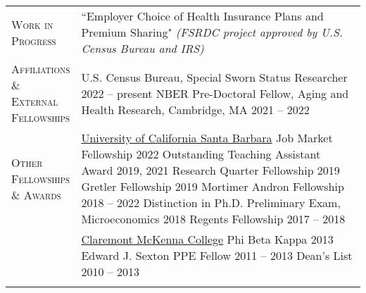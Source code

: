 \documentclass[11pt]{article}
\begin{document}
\begin{tabularx}{\textwidth}{@{}Y Z@{}}
    \textsc{Work in \newline Progress}  & 
    ``Employer Choice of Health Insurance Plans and Premium Sharing" \newline
    \textit{(FSRDC project approved by U.S. Census Bureau and IRS)} 
     \\ \addlinespace[20pt]

	\textsc{Affiliations \newline \& External \newline Fellowships}  & 
	U.S. Census Bureau, Special Sworn Status Researcher \hfill 2022 -- present%
	\vspace{3pt} \newline
	NBER Pre-Doctoral Fellow, Aging and Health Research, Cambridge, MA \hfill 2021 -- 2022%
	\\ \addlinespace[15pt]

	\textsc{Other \newline Fellowships \newline \& Awards} & 
	\uline{University of California Santa Barbara}
	\vspace{3pt} \newline
	Job Market Fellowship \hfill 2022%
	\vspace{3pt} \newline
	Outstanding Teaching Assistant Award \hfill 2019, 2021%
	\vspace{3pt} \newline
	Research Quarter Fellowship \hfill 2019%
	\vspace{3pt} \newline
	Gretler Fellowship \hfill 2019%
	\vspace{3pt} \newline 
	Mortimer Andron Fellowship \hfill 2018 -- 2022%
	\vspace{3pt} \newline 
	Distinction in Ph.D. Preliminary Exam, Microeconomics \hfill 2018%
	\vspace{3pt} \newline
	Regents Fellowship \hfill 2017 -- 2018%
	\\ \newpage 
	&
	\uline{Claremont McKenna College}
	\vspace{3pt} \newline
	Phi Beta Kappa \hfill 2013%
	\vspace{3pt} \newline
	Edward J. Sexton PPE Fellow \hfill 2011 -- 2013%
	\vspace{3pt} \newline
	Dean's List \hfill 2010 -- 2013%
	 \\ \addlinespace[20pt] 
	

\end{tabularx}
\end{document}
